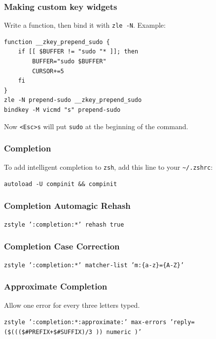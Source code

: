 \documentclass{beamer}
\begin{document}
\begin{frame}[fragile]
    \frametitle{Making custom key widgets}
    Write a function, then bind it with \texttt{zle -N}. Example:

    \medskip

    \begin{verbatim}
function __zkey_prepend_sudo {
    if [[ $BUFFER != "sudo "* ]]; then
        BUFFER="sudo $BUFFER"
        CURSOR+=5
    fi
}
zle -N prepend-sudo __zkey_prepend_sudo
bindkey -M vicmd "s" prepend-sudo\end{verbatim}

    \medskip

    Now \texttt{<Esc>s} will put \texttt{sudo} at the beginning of the command.
\end{frame}

\begin{frame}
    \frametitle{Completion}
    To add intelligent completion to \texttt{zsh}, add this line to your
    \texttt{\textasciitilde/.zshrc}:

    \medskip
    \centering \Large
    \texttt{autoload -U compinit \&\& compinit}
\end{frame}

\begin{frame}
    \frametitle{Completion Automagic Rehash}
    \centering \Large
    \texttt{zstyle ':completion:*' rehash true}
\end{frame}

\begin{frame}
    \frametitle{Completion Case Correction}
    \centering
    \texttt{zstyle ':completion:*' matcher-list 'm:\{a-z\}=\{A-Z\}'}
\end{frame}

\begin{frame}
    \frametitle{Approximate Completion}
    \centering
    Allow one error for every three letters typed.

    \medskip
    \texttt{zstyle ':completion:*:approximate:' max-errors
    'reply=(\$(((\$\#PREFIX+\$\#SUFFIX)/3 )) numeric )'}
\end{frame}
\end{document}

